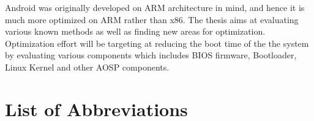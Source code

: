 \documentclass{mainreport}
\begin{document}
{
\label{Abstract}



\hspace{6mm} Android was originally developed on ARM architecture in mind, and hence it is much more optimized on ARM rather than x86. The thesis aims at evaluating various known methods as well as finding new areas for optimization. Optimization effort will be targeting at reducing the boot time of the the system by evaluating various components which includes BIOS firmware, Bootloader, Linux Kernel and other AOSP components.
}

\tableofcontents


%

%




\listoffigures
{}


\chapter*{List of Abbreviations}\label{abbrv}













\nocite{*}


\end{document}
